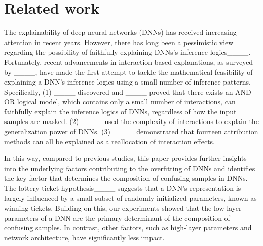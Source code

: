 \section{Related work}
The explainability of deep neural networks (DNNs) has received increasing attention in recent years. However, there has long been a pessimistic view regarding the possibility of faithfully explaining DNNs's inference logics____. Fortunately, recent advancements in interaction-based explanations, as surveyed by ____, have made the first attempt to tackle the mathematical feasibility of explaining a DNN's inference logics using a small number of inference patterns. Specifically, (1) ____ discovered and ____ proved that there exists an AND-OR logical model, which contains only a small number of interactions, can faithfully explain the inference logics of DNNs, regardless of how the input samples are masked. (2) ____ used the complexity of interactions to explain the generalization power of DNNs. (3) ____ demonstrated that fourteen attribution methods can all be explained as a reallocation of interaction effects.

In this way, compared to previous studies, this paper provides further insights into the underlying factors contributing to the overfitting of DNNs and identifies the key factor that determines the composition of confusing samples in DNNs. The lottery ticket hypothesis____ suggests that a DNN's representation is largely influenced by a small subset of randomly initialized parameters, known as winning tickets. Building on this, our experiments showed that the low-layer parameters of a DNN are the primary determinant of the composition of confusing samples. In contrast, other factors, such as high-layer parameters and network architecture, have significantly less impact.